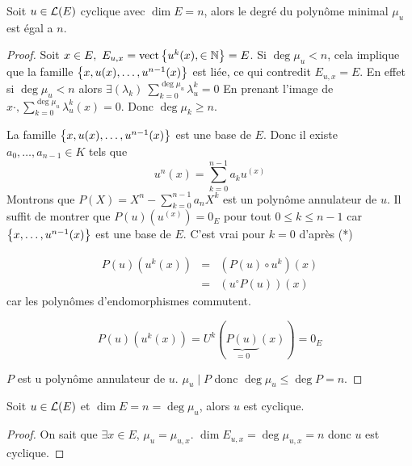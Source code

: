 \begin{prop}
	Soit $u \in \mathcal{L}(E)$ cyclique avec $\dim E = n$, alors le degré du polynôme minimal $\mu_u$ est égal a $n$.
\end{prop}


\begin{proof}
	Soit $x \in E, \ E_{u,x} = \text{vect} \left\{u^k(x),  \in \mathbb{N}\right\} = E$.
	Si $\deg \mu_u < n$, cela implique que la famille $\left\{x, u(x), \dots, u^{n-1}(x)\right\}$ est liée, ce qui
	contredit $E_{u,x} = E$. En effet si $\deg  \mu_u < n$ alors $\exists (\lambda_k) \ \sum_{k=0}^{\deg \mu_u} \lambda_ u^k = 0$
	En prenant l'image de $x·, \sum_{k=0}^{\deg \mu_u} \lambda_ u^k(x) =0$. Donc $\deg \mu_k \geq n$.

	La famille $\left\{x, u(x), \dots , u^{n-1}(x)\right\}$ est une base de $E$. Donc il existe $a_0, \dots, a_{n-1} \in K$ tels que
	$$ u^n(x) = \sum_{k=0}^{n-1} a_k u^(x) $$
	Montrons que $P(X) = X^n - \sum_{k=0}^{n-1}a_n X^k$ est un polynôme annulateur de $u$. Il suffit de montrer que $P(u)(u^(x)) = 0_E$
	pour tout $0 \leq k \leq n-1$ car $\left\{x, \dots, u^{n-1}(x)\right\}$ est une base de $E$. C'est vrai pour $k=0$ d'après (*) %

	\begin{eqnarray*}
		P(u)(u^k(x)) &=& (P(u) \circ u^k) (x)\\
		&=& (u^ \circ P(u)) (x)
	\end{eqnarray*}
	car les polynômes d'endomorphismes commutent.

	$$ P(u) (u^k(x)) = U^k(\underbrace{P(u)}_{=0} (x)) = 0_E$$

	$P$ est u polynôme annulateur de $u$.
	$\mu_u \mid P$ donc $\deg \mu_u \leq \deg P = n$.
\end{proof}


\begin{prop}
	Soit $u \in \mathcal{L}(E)$ et $\dim E = n = \deg \mu_u$, alors $u$ est cyclique.
\end{prop}

\begin{proof}
	On sait que $\exists x \in E$, $\mu_u = \mu_{u,x}$.
	$\dim E_{u,x} = \deg \mu_{u,x} = n$
	donc $u$ est cyclique.
\end{proof}
